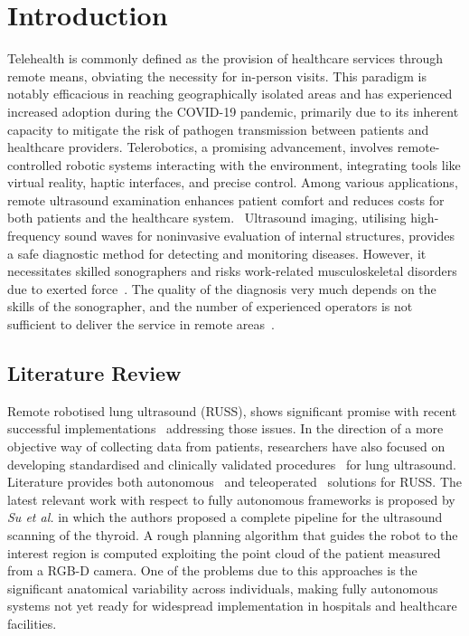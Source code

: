 \cleardoublepage
\chapter{Introduction}

Telehealth is commonly defined as the provision of healthcare services through remote means, obviating the necessity for in-person visits.
This paradigm is notably efficacious in reaching geographically isolated areas and has experienced increased adoption during the COVID-19 pandemic, primarily due to its inherent capacity to mitigate the risk of pathogen transmission between patients and healthcare providers.
Telerobotics, a promising advancement, involves remote-controlled robotic systems interacting with the environment, integrating tools like virtual reality\cite{meng2023virtual}, haptic interfaces\cite{nahri2021review}, and precise control\cite{ruwanthika2020precise}. Among various applications, remote ultrasound examination enhances patient comfort and reduces costs for both patients and the healthcare system.~\cite{eu2018market,who2022consolidated}
Ultrasound imaging, utilising high-frequency sound waves for noninvasive evaluation of internal structures, provides a safe diagnostic method for detecting and monitoring diseases. However, it necessitates skilled sonographers and risks work-related musculoskeletal disorders due to exerted force~\cite{coffin2014work}. The quality of the diagnosis very much depends on the skills of the sonographer, and the number of experienced operators is not sufficient to deliver the service in remote areas~\cite{li2021overview}.

\section{Literature Review}

Remote robotised lung ultrasound (RUSS), shows significant promise with recent successful implementations~\cite{avgousti2016medical,jiang2023robotic} addressing those issues. 
In the direction of a more objective way of collecting data from patients, researchers have also focused on developing standardised and clinically validated procedures~\cite{Soldati2020ProposalCOVID-19,Demi2023NewUltrasound} for lung ultrasound.
Literature provides both autonomous~\cite{su2024fully,li2021overview,roshan2022robotic} and 
teleoperated~\cite{vonhaxthausen2021medical,jiang2023robotic} solutions for RUSS. The latest relevant work with respect to fully autonomous frameworks is proposed by \textit{Su et al.}  \cite{su2024fully} in which the authors proposed a complete pipeline for the ultrasound scanning of the thyroid. A rough planning algorithm that guides the robot to the interest region is computed exploiting the point cloud of the patient measured from a RGB-D camera. One of the problems due to this approaches is the significant anatomical variability across individuals, making fully autonomous systems not yet ready for widespread implementation in hospitals and healthcare facilities.

